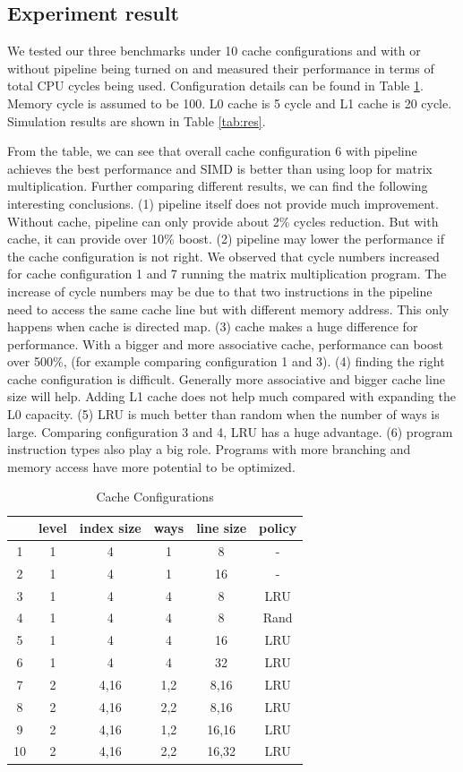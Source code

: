 \documentclass{sig-alternate}
\begin{document}
\subsection{Experiment result}
We tested our three benchmarks under 10 cache configurations and with or without pipeline being turned on and measured their performance in terms of total CPU cycles being used. Configuration details can be found in Table \ref{tab:conf}. Memory cycle is assumed to be 100. L0 cache is 5 cycle and L1 cache is 20 cycle. Simulation results are shown in Table \ref{tab:res}. 

From the table, we can see that overall cache configuration 6 with pipeline achieves the best performance and SIMD is better than using loop for matrix multiplication. Further comparing different results, we can find the following interesting conclusions. (1) pipeline itself does not provide much improvement. Without cache, pipeline can only provide about 2\% cycles reduction. But with cache, it can provide over 10\% boost. (2) pipeline may lower the performance if the cache configuration is not right. We observed that cycle numbers increased for cache configuration 1 and 7 running the matrix multiplication program. The increase of cycle numbers may be due to that two instructions in the pipeline need to access the same cache line but with different memory address. This only happens when cache is directed map. (3) cache makes a huge difference for performance. With a bigger and more associative cache, performance can boost over 500\%, (for example comparing configuration 1 and 3). (4) finding the right cache configuration is difficult. Generally more associative and bigger cache line size will help. Adding L1 cache does not help much compared with expanding the L0 capacity. (5) LRU is much better than random when the number of ways is large. Comparing configuration 3 and 4, LRU has a huge advantage. (6) program instruction types also play a big role. Programs with more branching and memory access have more potential to be optimized. 

\begin{table}
\caption{Cache Configurations}
\label{tab:conf}
\centering
\begin{tabular}{|c|c|c|c|c|c|}
\hline
 & level & index size & ways & line size & policy \\ \hline
 1 & 1& 4 & 1& 8& -\\
\hline
 2 & 1& 4 & 1& 16 & -\\
\hline
 3 & 1& 4 & 4& 8& LRU\\
\hline
 4 & 1& 4 & 4& 8& Rand\\
\hline
 5 & 1& 4 & 4& 16& LRU\\
\hline
 6 & 1& 4 & 4& 32& LRU\\
\hline
 7 & 2 & 4,16 & 1,2& 8,16& LRU\\
\hline
 8 & 2 & 4,16 & 2,2& 8,16& LRU\\
\hline
 9 & 2 & 4,16 & 1,2& 16,16& LRU\\
\hline
 10 & 2 & 4,16 & 2,2& 16,32& LRU\\
\hline
\end{tabular}
\end{table}
\end{document}
